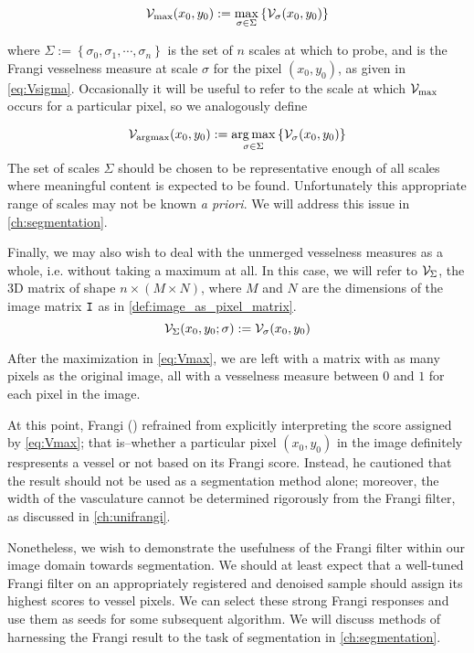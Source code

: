    \begin{equation} \label{eq:Vmax}
    \mathcal{V}_{\max}(x_0, y_0) :=
    	\underset{\sigma \in \Sigma}{\max}\left\{  \mathcal{V}_{\sigma} (x_0, y_0) \right\}
    \end{equation}
    
    where $\Sigma := \left\{ \sigma_0, \sigma_1 , \cdots, \sigma_n \right\}$ is
    the set of $n$ scales at which to probe, and \Vsigma is the Frangi vesselness measure at scale $\sigma$ for the pixel $(x_0,y_0)$, as given in \cref{eq:Vsigma}.
    Occasionally it will be useful to refer to the scale at which $\mathcal{V}_{\max}$ occurs for a 
    particular pixel, so we analogously define
    
    \begin{equation} \label{eq:Vargmax}
    \mathcal{V}_{\mathrm{argmax}}(x_0, y_0) := \underset{\sigma \in \Sigma}{\arg\max}\left\{  \mathcal{V}_{\sigma} (x_0, y_0) \right\}
    \end{equation}
The set of scales $\Sigma$ should be chosen to be representative enough of all scales where meaningful content is expected to be found. Unfortunately this appropriate range of scales may not be known \textit{a priori}. We will address this issue in \cref{ch:segmentation}.

Finally, we may also wish to deal with the unmerged vesselness measures as a whole, i.e. without taking a maximum at all. In this case, we will refer to $\mathcal{V}_{\Sigma}$, the 3D matrix of shape
$n \times (M\times N)$, where $M$ and $N$ are the dimensions of the image matrix $\mathtt{I}$
as in \cref{def:image_as_pixel_matrix}.
	\begin{equation} \label{eq:VSigma}
	\mathcal{V}_{\Sigma}(x_0,y_0 ; \sigma) := \mathcal{V}_{\sigma}(x_0,y_0)
\end{equation}

    
    After the maximization in \cref{eq:Vmax}, we are left with a matrix with as many pixels as the original image, all with a vesselness measure between $0$ and $1$ for each pixel in the image.
         
    At this point, Frangi (\citeyear{frangi-paper}) refrained from explicitly interpreting the score assigned by \cref{eq:Vmax}; that is--whether a particular pixel $(x_0,y_0)$ in the image definitely respresents a vessel or not based on its Frangi score. Instead, he cautioned that the result should not be used as a segmentation method alone; moreover, the width of the vasculature cannot be determined rigorously from the Frangi filter, as discussed in \cref{ch:unifrangi}. 
   
    Nonetheless, we wish to demonstrate the usefulness of the Frangi filter within our image domain towards segmentation. We should at least expect that a well-tuned Frangi filter on an appropriately registered and denoised sample should assign its highest scores to vessel pixels. We can select these strong Frangi responses and use them as seeds for some subsequent algorithm. We will discuss methods of harnessing the Frangi result to the task of segmentation in \cref{ch:segmentation}.
    
